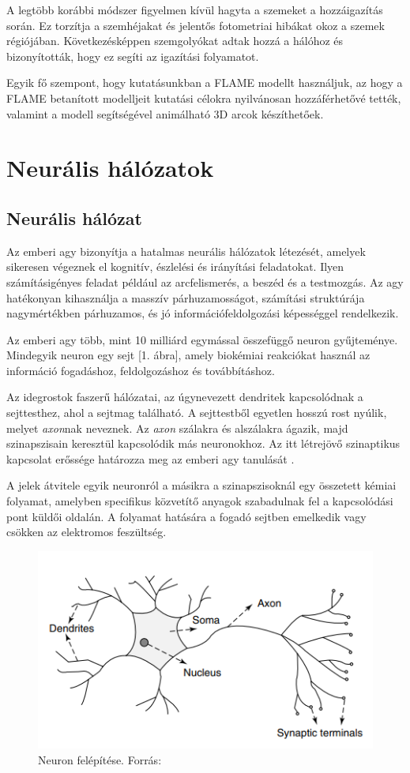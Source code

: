 \documentclass[12pt,a4]{article}
\begin{document}
    A legtöbb korábbi módszer figyelmen kívül hagyta a szemeket a
    hozzáigazítás során. Ez torzítja a szemhéjakat és jelentős fotometriai hibákat okoz a szemek régiójában. Következésképpen szemgolyókat adtak hozzá a hálóhoz és bizonyították, hogy ez segíti az igazítási folyamatot.

    Egyik fő szempont, hogy kutatásunkban a FLAME modellt használjuk, az hogy a FLAME betanított modelljeit kutatási célokra nyilvánosan hozzáférhetővé tették, valamint a modell segítségével animálható 3D arcok készíthetőek.
	
	\section{Neurális hálózatok}
	\subsection{Neurális hálózat}
	\label{NN}
	Az emberi agy bizonyítja a hatalmas neurális hálózatok \cite{ann} létezését, amelyek sikeresen végeznek el kognitív, észlelési és irányítási feladatokat. Ilyen számításigényes feladat például az arcfelismerés, a beszéd és a testmozgás. Az agy hatékonyan kihasználja a masszív párhuzamosságot, számítási struktúrája nagymértékben párhuzamos, és jó információfeldolgozási képességgel rendelkezik.
	
	Az emberi agy több, mint 10 milliárd egymással összefüggő neuron gyűjteménye. Mindegyik neuron egy sejt [1. ábra], amely biokémiai reakciókat használ az információ fogadáshoz, feldolgozáshoz és továbbításhoz.
	
	Az idegrostok faszerű hálózatai, az úgynevezett dendritek kapcsolódnak a sejttesthez, ahol a sejtmag található. A sejttestből egyetlen hosszú rost nyúlik, melyet \textit{axon}nak neveznek. Az \textit{axon} szálakra és alszálakra ágazik, majd szinapszisain keresztül kapcsolódik más neuronokhoz. Az itt létrejövő szinaptikus kapcsolat erőssége határozza meg az emberi agy tanulását\cite{ann} .
	
	A jelek átvitele egyik neuronról a másikra a szinapszisoknál egy összetett kémiai folyamat, amelyben specifikus közvetítő anyagok szabadulnak fel a kapcsolódási pont küldői oldalán. A folyamat hatására a fogadó sejtben emelkedik vagy csökken az elektromos feszültség\cite{ann}.
	\begin{figure}[h]	
		\centering
		\includegraphics[width=1\linewidth]{neuron1}
		\caption{Neuron felépítése. 
			Forrás:\cite{ann}}
	\end{figure}
	\newpage
\end{document}
